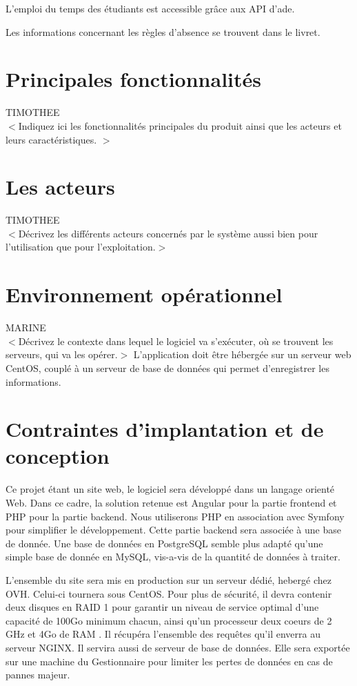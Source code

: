 L'emploi du temps des étudiants est accessible grâce aux \acrshort{API} d'\acrshort{ade}.

Les informations concernant les règles d'absence se trouvent dans le \Gls{livret}.

\section{Principales fonctionnalités}
TIMOTHEE\\
$<$Indiquez ici les fonctionnalités principales du produit ainsi que les acteurs et leurs caractéristiques. $>$

\section{Les acteurs}
TIMOTHEE\\
$<$Décrivez les différents acteurs concernés par le système aussi bien pour l'utilisation que pour l'exploitation.$>$

\section{Environnement opérationnel}
MARINE\\
$<$Décrivez le contexte dans lequel le logiciel va s'exécuter, où se trouvent les serveurs, qui va les opérer.$>$
L'application doit être hébergée sur un serveur web CentOS, couplé à un serveur de base de données qui permet d'enregistrer les informations.

\section{Contraintes d'implantation et de conception}

Ce projet étant un site web, le logiciel sera développé dans un langage orienté Web. Dans ce cadre, la solution retenue est Angular pour la partie frontend et PHP pour la partie backend. Nous utiliserons PHP en association avec Symfony pour simplifier le développement. Cette partie backend sera associée à une base de donnée. Une base de données en PostgreSQL semble plus adapté qu'une simple base de donnée en MySQL, vis-a-vis de la quantité de données à traiter.

L'ensemble du site sera mis en production sur un serveur dédié, hebergé chez OVH. Celui-ci tournera sous CentOS. Pour plus de sécurité, il devra contenir deux disques en RAID 1 pour garantir un niveau de service optimal d'une capacité de 100Go minimum chacun, ainsi qu'un processeur deux coeurs de 2 GHz et 4Go de RAM . Il récupéra l'ensemble des requêtes qu'il enverra au serveur NGINX. Il servira aussi de serveur de base de données. Elle sera exportée sur une machine du Gestionnaire pour limiter les pertes de données en cas de pannes majeur.

